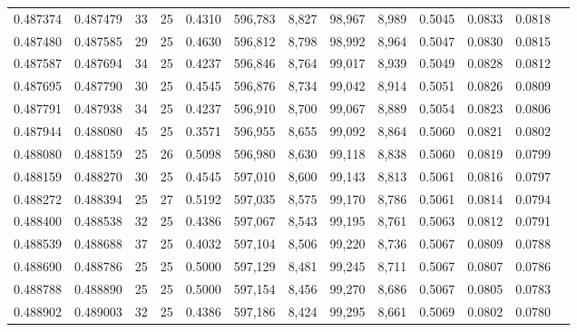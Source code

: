 \begin{tabular}{rrrrrrrrrrrrr}
0.487374 & 0.487479 &    33 &  25 &                                     0.4310 & 596,783 &   8,827 &  98,967 &   8,989 & 0.5045 & 0.0833 & 0.0818 \\
0.487480 & 0.487585 &    29 &  25 &                                     0.4630 & 596,812 &   8,798 &  98,992 &   8,964 & 0.5047 & 0.0830 & 0.0815 \\
0.487587 & 0.487694 &    34 &  25 &                                     0.4237 & 596,846 &   8,764 &  99,017 &   8,939 & 0.5049 & 0.0828 & 0.0812 \\
0.487695 & 0.487790 &    30 &  25 &                                     0.4545 & 596,876 &   8,734 &  99,042 &   8,914 & 0.5051 & 0.0826 & 0.0809 \\
0.487791 & 0.487938 &    34 &  25 &                                     0.4237 & 596,910 &   8,700 &  99,067 &   8,889 & 0.5054 & 0.0823 & 0.0806 \\
0.487944 & 0.488080 &    45 &  25 &                                     0.3571 & 596,955 &   8,655 &  99,092 &   8,864 & 0.5060 & 0.0821 & 0.0802 \\
0.488080 & 0.488159 &    25 &  26 &                                     0.5098 & 596,980 &   8,630 &  99,118 &   8,838 & 0.5060 & 0.0819 & 0.0799 \\
0.488159 & 0.488270 &    30 &  25 &                                     0.4545 & 597,010 &   8,600 &  99,143 &   8,813 & 0.5061 & 0.0816 & 0.0797 \\
0.488272 & 0.488394 &    25 &  27 &                                     0.5192 & 597,035 &   8,575 &  99,170 &   8,786 & 0.5061 & 0.0814 & 0.0794 \\
0.488400 & 0.488538 &    32 &  25 &                                     0.4386 & 597,067 &   8,543 &  99,195 &   8,761 & 0.5063 & 0.0812 & 0.0791 \\
0.488539 & 0.488688 &    37 &  25 &                                     0.4032 & 597,104 &   8,506 &  99,220 &   8,736 & 0.5067 & 0.0809 & 0.0788 \\
0.488690 & 0.488786 &    25 &  25 &                                     0.5000 & 597,129 &   8,481 &  99,245 &   8,711 & 0.5067 & 0.0807 & 0.0786 \\
0.488788 & 0.488890 &    25 &  25 &                                     0.5000 & 597,154 &   8,456 &  99,270 &   8,686 & 0.5067 & 0.0805 & 0.0783 \\
0.488902 & 0.489003 &    32 &  25 &                                     0.4386 & 597,186 &   8,424 &  99,295 &   8,661 & 0.5069 & 0.0802 & 0.0780 \\

\end{tabular}
